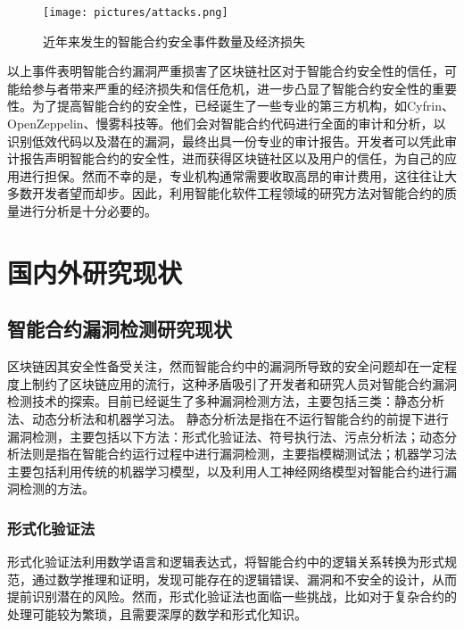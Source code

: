 \begin{figure}[htbp]
    \centering
    \texttt{[image: pictures/attacks.png]}
    \caption{\label{fig:attacks_events}近年来发生的智能合约安全事件数量及经济损失}
\end{figure}
    
以上事件表明智能合约漏洞严重损害了区块链社区对于智能合约安全性的信任，可能给参与者带来严重的经济损失和信任危机，进一步凸显了智能合约安全性的重要性。为了提高智能合约的安全性，已经诞生了一些专业的第三方机构，如Cyfrin、OpenZeppelin、慢雾科技等。他们会对智能合约代码进行全面的审计和分析，以识别低效代码以及潜在的漏洞，最终出具一份专业的审计报告。开发者可以凭此审计报告声明智能合约的安全性，进而获得区块链社区以及用户的信任，为自己的应用进行担保。然而不幸的是，专业机构通常需要收取高昂的审计费用，这往往让大多数开发者望而却步。因此，利用智能化软件工程领域的研究方法对智能合约的质量进行分析是十分必要的。




\section{国内外研究现状}
\label{sec:国内外研究现状}
\subsection{智能合约漏洞检测研究现状}
\label{sec:智能合约漏洞检测研究现状}
区块链因其安全性备受关注，然而智能合约中的漏洞所导致的安全问题却在一定程度上制约了区块链应用的流行，这种矛盾吸引了开发者和研究人员对智能合约漏洞检测技术的探索。目前已经诞生了多种漏洞检测方法，主要包括三类：静态分析法、动态分析法和机器学习法。
静态分析法是指在不运行智能合约的前提下进行漏洞检测，主要包括以下方法：形式化验证法、符号执行法、污点分析法；动态分析法则是指在智能合约运行过程中进行漏洞检测，主要指模糊测试法；机器学习法主要包括利用传统的机器学习模型，以及利用人工神经网络模型对智能合约进行漏洞检测的方法。
\subsubsection{形式化验证法}
    
    形式化验证法利用数学语言和逻辑表达式，将智能合约中的逻辑关系转换为形式规范，通过数学推理和证明，发现可能存在的逻辑错误、漏洞和不安全的设计，从而提前识别潜在的风险。然而，形式化验证法也面临一些挑战，比如对于复杂合约的处理可能较为繁琐，且需要深厚的数学和形式化知识。
    
